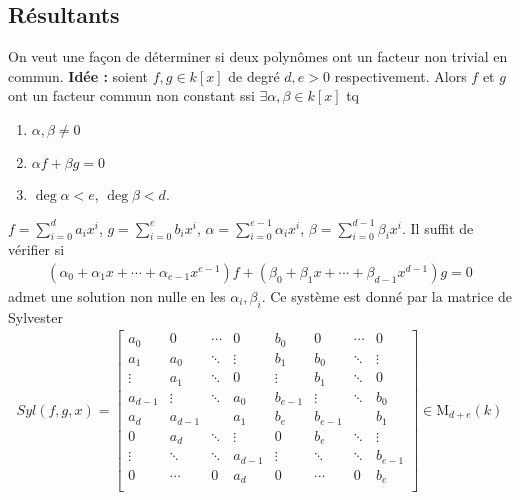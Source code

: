         \subsection{Résultants}
            On veut une façon de déterminer si deux polynômes ont un facteur non trivial en commun. \textbf{Idée :} soient $f,g \in k[x]$ de degré $d,e > 0$ respectivement. Alors $f$ et $g$ ont un facteur commun non constant ssi $\exists \alpha, \beta \in k[x]$ tq 
            \begin{enumerate}
                \item $\alpha, \beta \neq 0$
                \item $\alpha f + \beta g = 0$
                \item $\deg \alpha < e$, $\deg \beta < d$.
            \end{enumerate}
            $f = \sum_{i = 0}^d a_ix^i$, $g = \sum_{i = 0}^e b_i x^i$, $\alpha = \sum_{i = 0}^{e-1} \alpha_i x^i$, $\beta = \sum_{i = 0}^{d-1} \beta_i x^i$. Il suffit de vérifier si
            \begin{align*}
                (\alpha_0 + \alpha_1x + \cdots + \alpha_{e-1}x^{e-1})f + (\beta_0 + \beta_1x + \cdots + \beta_{d-1}x^{d-1})g = 0
            \end{align*}
            admet une solution non nulle en les $\alpha_i, \beta_i$. Ce système est donné par la matrice de Sylvester
            \begin{align*}
                Syl(f,g,x) =
                \begin{bmatrix}
                    a_0 & 0 & \cdots & 0 & b_0 & 0 & \cdots & 0 \\
                    a_1 & a_0 & \ddots & \vdots & b_1 & b_0 & \ddots & \vdots \\
                    \vdots & a_1 & \ddots & 0 & \vdots & b_1 & \ddots & 0 \\
                    a_{d-1} & \vdots & \ddots & a_0 & b_{e-1} & \vdots & \ddots & b_0 \\
                    a_d & a_{d-1} & & a_1 & b_e & b_{e-1} & & b_1 \\
                    0 & a_d & \ddots & \vdots & 0 & b_e & \ddots & \vdots \\
                    \vdots & \ddots & \ddots & a_{d-1} & \vdots & \ddots & \ddots & b_{e-1} \\
                    0 & \cdots & 0 & a_d & 0 & \cdots & 0 & b_e \\
                \end{bmatrix}
                \in \mathrm{M}_{d+e}(k)
            \end{align*}
